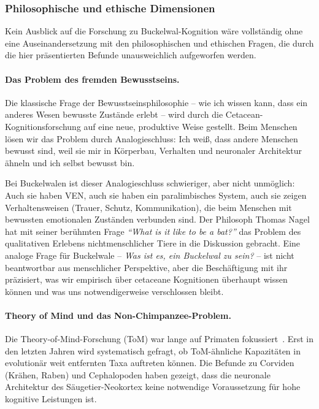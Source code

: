 ﻿\documentclass[12pt,a4paper]{article}
\theoremstyle{definition}
\theoremstyle{remark}
\begin{document}
\subsubsection{Philosophische und ethische Dimensionen}

Kein Ausblick auf die Forschung zu Buckelwal-Kognition wäre vollständig ohne eine Auseinandersetzung mit den philosophischen und ethischen Fragen, die durch die hier präsentierten Befunde unausweichlich aufgeworfen werden.

\paragraph{Das Problem des fremden Bewusstseins.}
Die klassische Frage der Bewusstseinsphilosophie -- wie ich wissen kann, dass ein anderes Wesen bewusste Zustände erlebt -- wird durch die Cetacean-Kognitionsforschung auf eine neue, produktive Weise gestellt. Beim Menschen lösen wir das Problem durch Analogieschluss: Ich weiß, dass andere Menschen bewusst sind, weil sie mir in Körperbau, Verhalten und neuronaler Architektur ähneln und ich selbst bewusst bin.

Bei Buckelwalen ist dieser Analogieschluss schwieriger, aber nicht unmöglich: Auch sie haben VEN, auch sie haben ein paralimbisches System, auch sie zeigen Verhaltensweisen (Trauer, Schutz, Kommunikation), die beim Menschen mit bewussten emotionalen Zuständen verbunden sind. Der Philosoph Thomas Nagel~\cite{nagel1974bat} hat mit seiner berühmten Frage \emph{``What is it like to be a bat?''} das Problem des qualitativen Erlebens nichtmenschlicher Tiere in die Diskussion gebracht. Eine analoge Frage für Buckelwale -- \emph{Was ist es, ein Buckelwal zu sein?} -- ist nicht beantwortbar aus menschlicher Perspektive, aber die Beschäftigung mit ihr präzisiert, was wir empirisch über cetaceane Kognitionen überhaupt wissen können und was uns notwendigerweise verschlossen bleibt.

\paragraph{Theory of Mind und das Non-Chimpanzee-Problem.}
Die Theory-of-Mind-Forsch\-ung (ToM) war lange auf Primaten fokussiert~\cite{call2003chimpanzees, premack1978chimpanzee}. Erst in den letzten Jahren wird systematisch gefragt, ob ToM-ähnliche Kapazitäten in evolutionär weit entfernten Taxa auftreten können. Die Befunde zu Corviden (Krähen, Raben) und Cephalopoden haben gezeigt, dass die neuronale Architektur des Säugetier-Neokortex keine notwendige Voraussetzung für hohe kognitive Leistungen ist.
\end{document}
